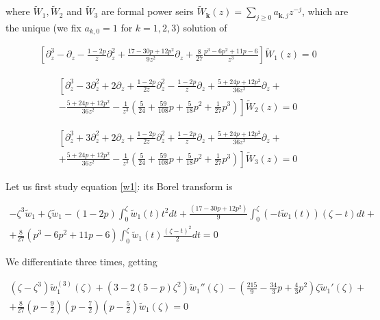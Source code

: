 \documentclass{article}
\theoremstyle{definition}
\begin{document}
where $\tilde{W}_1, \tilde{W}_2$ and $\tilde{W}_3$ are formal power seirs $\tilde{W}_{\mathbf{k}}(z)=\sum_{j\geq 0}a_{\mathbf{k},j}z^{-j}$, which are the unique (we fix $a_{k,0}=1$ for $k=1,2,3$) solution of 

\begin{multline}\label{w1}
\left[\partial_z^3-\partial_z-\frac{1-2p}{z}\partial_z^2+\frac{17-30p+12p^2}{9z^2}\partial_z+\frac{8}{27}\frac{p^3-6 p^2+ 11p- 6}{z^3}\right]\tilde{W}_1(z)=0
\end{multline}


\begin{multline}\label{w2}
\left[\partial_z^3-3\partial_z^2+2\partial_z+\frac{1-2p}{2z}\partial_z^2-\frac{1-2p}{z}\partial_z+\frac{5+24p+12p^2}{36z^2}\partial_z+\right.\\
\left.-\frac{5+24p+12p^2}{36z^2}-\frac{1}{z^3}\left(\frac{5}{24}+\frac{59}{108}p+\frac{5}{18}p^2+\frac{1}{27}p^3\right)\right]\tilde{W}_2(z)=0
\end{multline}

\begin{multline}\label{w3}
\left[\partial_z^3+3\partial_z^2+2\partial_z+\frac{1-2p}{2z}\partial_z^2+\frac{1-2p}{z}\partial_z+\frac{5+24p+12p^2}{36z^2}\partial_z+\right.\\
\left.+\frac{5+24p+12p^2}{36z^2}-\frac{1}{z^3}\left(\frac{5}{24}+\frac{59}{108}p+\frac{5}{18}p^2+\frac{1}{27}p^3\right)\right]\tilde{W}_3(z)=0
\end{multline}


Let us first study equation \eqref{w1}: its Borel transform is

\begin{multline*}
-\zeta^3\tilde{w}_1+\zeta\tilde{w}_1-(1-2p)\int_0^\zeta\tilde{w}_1(t)t^2dt+\frac{(17-30p+12p^2)}{9}\int_0^\zeta(-t\tilde{w}_1(t))(\zeta-t)dt+\\
+\frac{8}{27}(p^3-6p^2+11p-6)\int_0^\zeta\tilde{w}_1(t)\frac{(\zeta-t)^2}{2}dt=0
\end{multline*}

We differentiate three times, getting 

\begin{multline*}
\left(\zeta-\zeta^3\right)\tilde{w}_1^{(3)}(\zeta)+\left(3-2(5-p)\zeta^2\right)\tilde{w}_1''(\zeta)-\left(\frac{215}{9}-\frac{34}{3}p+\frac{4}{3}p^2\right)\zeta\tilde{w}_1'(\zeta)+\\
+\frac{8}{27}\left(p-\frac{9}{2}\right)\left(p-\frac{7}{2}\right)\left(p-\frac{5}{2}\right)\tilde{w}_1(\zeta)=0
\end{multline*}
\end{document}
